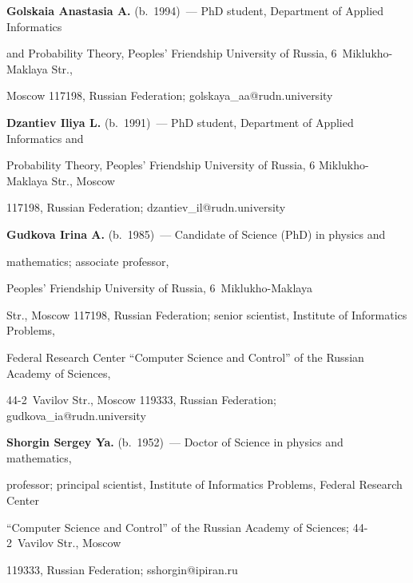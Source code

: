 \textbf{Golskaia Anastasia A.} (b.\ 1994)~--- PhD student, Department of Applied Informatics 


and Probability Theory, Peoples' Friendship University of Russia, 6~Miklukho-Maklaya Str., 


Moscow 117198, Russian Federation; \mbox{golskaya\_aa@rudn.university}





\vspace*{5pt}





\noindent


\textbf{Dzantiev Iliya L.} (b.\ 1991)~--- PhD student, Department of Applied Informatics and 


Probability Theory, Peoples' Friendship University of Russia, 6 Miklukho-Maklaya Str., Moscow 


117198, Russian Federation; \mbox{dzantiev\_il@rudn.university}





\vspace*{5pt}





\noindent


\textbf{Gudkova Irina A.} (b.\ 1985)~--- Candidate of Science (PhD) in physics and 


mathematics; associate professor, 


Peoples' Friendship University of Russia, 6~Miklukho-Maklaya 


Str., Moscow 117198, Russian Federation; senior scientist, Institute of Informatics Problems, 


Federal Research Center ``Computer Science and Control'' of the Russian Academy of Sciences, 


44-2~Vavilov Str., Moscow 119333, Russian Federation; \mbox{gudkova\_ia@rudn.university}





\vspace*{5pt}





\noindent


\textbf{Shorgin Sergey Ya.} (b.\ 1952)~--- Doctor of Science in physics and mathematics, 


professor; principal scientist, Institute of Informatics Problems, Federal Research Center 


``Computer Science and Control'' of the Russian Academy of Sciences; 44-2~Vavilov Str., Moscow 


119333, Russian Federation; \mbox{sshorgin@ipiran.ru}








\label{end\stat}





\renewcommand{\bibname}{\protect\rm Литература}       


